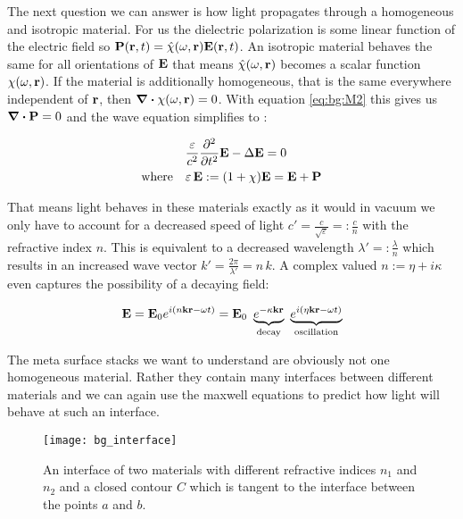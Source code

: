 \label{par:light_in_materials}
\noindent
The next question we can answer is how light propagates through a homogeneous and isotropic material. For us the dielectric polarization is some linear function of the electric field so $\vb P(\vb r, t) = \hat{\chi}(\omega, \vb r) \vb E(\vb r, t)$. An isotropic material behaves the same for all orientations of $\vb E$ that means $\hat{\chi}(\omega, \vb r)$ becomes a scalar function $\chi(\omega, \vb r)$. If the material is additionally homogeneous, that is the same everywhere independent of $\vb r$, then $\div \chi(\omega, \vb r) = 0$. With equation \eqref{eq:bg:M2} this gives us $\div \vb P = 0$
and the wave equation simplifies to :

\begin{equation}
\begin{aligned}
    &\frac{\varepsilon}{c^2} \pdv[2] t \vb E - \Delta \vb E = 0\\
    \qq*{where} &\varepsilon \, \vb E := \qty(1 + \chi) \vb E = \vb E + \vb P
\end{aligned}
\end{equation}

That means light behaves in these materials exactly as it would in vacuum we only have to account for a decreased speed of light
$c' = \frac{c}{\sqrt{\varepsilon}} =: \frac{c}{n}$
with the refractive index $n$.
This is equivalent to a decreased wavelength
$\lambda' =: \frac{\lambda}{n}$
which results in an increased wave vector
$k' = \frac{2 \pi}{\lambda'} = n \, k$.
A complex valued $n := \eta + i \kappa$ even captures the possibility of a decaying field:

\begin{equation}
    \vb E = \vb E_0 e^{i(n \vb k \vb r - \omega t)}
    = \vb E_0 \
    \underbrace{e^{-\kappa \vb k \vb r}}_{\mathrm{
    decay}} \
    \underbrace{e^{i(\eta \vb k \vb r - \omega t)}}_{\mathrm{
    oscillation}}
\end{equation}

The meta surface stacks we want to understand are obviously not one homogeneous material. Rather they contain many interfaces between different materials and we can again use the maxwell equations to predict how light will behave at such an interface.
\\

\begin{figure}[H]
    \centering
    \texttt{[image: bg\_interface]}
    \caption{An interface of two materials with different refractive indices $n_1$ and $n_2$ and a closed contour $C$ which is tangent to the interface between the points $a$ and $b$.}
    \label{fig:bg:interface}
\end{figure}

